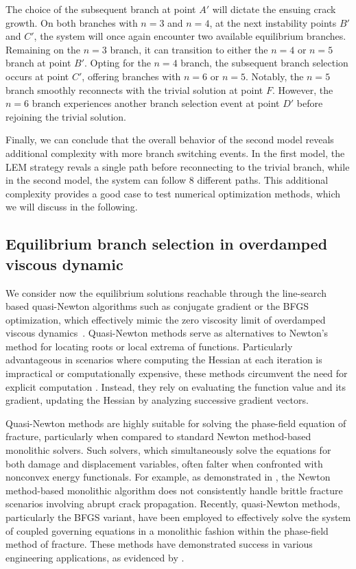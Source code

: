 The choice of the subsequent branch at point $A'$ will dictate the ensuing crack growth. On both branches with $n=3$ and $n=4$, at the next instability points $B'$ and $C'$, the system will once again encounter two available equilibrium branches. Remaining on the $n=3$ branch, it can transition to either the $n=4$ or $n=5$ branch at point $B'$. Opting for the $n=4$ branch, the subsequent branch selection occurs at point $C'$, offering branches with $n=6$ or $n=5$. Notably, the $n=5$ branch smoothly reconnects with the trivial solution at point $F$. However, the $n=6$ branch experiences another branch selection event at point $D'$ before rejoining the trivial solution. 

Finally, we can conclude that  the overall behavior of the second model   reveals additional complexity with more branch switching events. In the first model, the LEM strategy revals a single path before reconnecting to the trivial branch, while in the second model, the system can follow 8 different paths. This additional complexity provides a good case to test numerical optimization methods, which we will discuss in the following.

\subsection{Equilibrium branch selection in overdamped viscous dynamic}
We consider now the equilibrium solutions reachable through the line-search based quasi-Newton algorithms such as  conjugate gradient or the BFGS optimization, which effectively  mimic the zero viscosity limit of overdamped viscous dynamics~\cite{SALMAN2012219}. Quasi-Newton methods serve as alternatives to Newton's method for locating roots or local extrema of functions. Particularly advantageous in scenarios where computing the Hessian at each iteration is impractical or computationally expensive, these methods circumvent the need for explicit computation . Instead, they rely on evaluating the function value and its gradient, updating the Hessian by analyzing successive gradient vectors.

Quasi-Newton methods are highly suitable for solving the phase-field equation of fracture, particularly when compared to standard Newton method-based monolithic solvers. Such solvers, which simultaneously  solve the equations for both damage and displacement variables, often falter when confronted with nonconvex energy functionals. For example, as demonstrated in \cite{Wick2017-bo}, the Newton method-based monolithic algorithm does not consistently handle brittle fracture scenarios involving abrupt crack propagation. Recently, quasi-Newton methods, particularly the BFGS variant, have been employed to effectively solve the system of coupled governing equations in a monolithic fashion within the phase-field method of fracture. These methods have demonstrated success in various engineering applications, as evidenced by \cite{Kristensen2020-zy,Wu2020-qk,Salman2021-mn,Liu2022-ix}.

